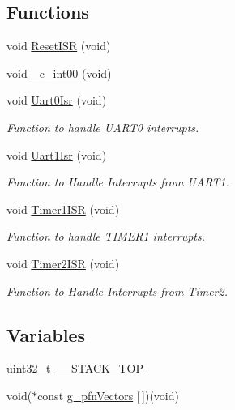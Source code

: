 \subsection*{Functions}
\begin{DoxyCompactItemize}
\item 
void \mbox{\hyperlink{tm4c123gh6pm__startup__ccs_8c_a516ff8924be921fa3a1bb7754b1f5734}{Reset\+I\+SR}} (void)
\item 
void \mbox{\hyperlink{tm4c123gh6pm__startup__ccs_8c_a3c8534f5781f4cf53ffbeb6d35880b27}{\+\_\+c\+\_\+int00}} (void)
\item 
void \mbox{\hyperlink{tm4c123gh6pm__startup__ccs_8c_affa7c2cc09d04fc57b05c5644b1c8a68}{Uart0\+Isr}} (void)
\begin{DoxyCompactList}\small\item\em Function to handle U\+A\+R\+T0 interrupts. \end{DoxyCompactList}\item 
void \mbox{\hyperlink{tm4c123gh6pm__startup__ccs_8c_af19c26d9a6dc91ca0e5358bef906f61f}{Uart1\+Isr}} (void)
\begin{DoxyCompactList}\small\item\em Function to Handle Interrupts from U\+A\+R\+T1. \end{DoxyCompactList}\item 
void \mbox{\hyperlink{tm4c123gh6pm__startup__ccs_8c_afdad67070c699e644b8ddae35b29347b}{Timer1\+I\+SR}} (void)
\begin{DoxyCompactList}\small\item\em Function to handle T\+I\+M\+E\+R1 interrupts. \end{DoxyCompactList}\item 
void \mbox{\hyperlink{tm4c123gh6pm__startup__ccs_8c_a424b9010ddc61d3484dca1b6af5af5b0}{Timer2\+I\+SR}} (void)
\begin{DoxyCompactList}\small\item\em Function to Handle Interrupts from Timer2. \end{DoxyCompactList}\end{DoxyCompactItemize}
\subsection*{Variables}
\begin{DoxyCompactItemize}
\item 
uint32\+\_\+t \mbox{\hyperlink{tm4c123gh6pm__startup__ccs_8c_ac1f2b7c32de8681c4f4184ca6efca568}{\+\_\+\+\_\+\+S\+T\+A\+C\+K\+\_\+\+T\+OP}}
\item 
void($\ast$const \mbox{\hyperlink{tm4c123gh6pm__startup__ccs_8c_a28c770c8f2522f11e2a95f7486620c5b}{g\+\_\+pfn\+Vectors}} \mbox{[}$\,$\mbox{]})(void)
\end{DoxyCompactItemize}


